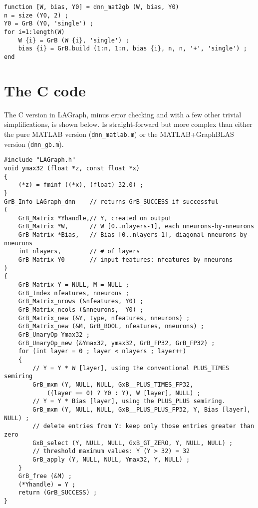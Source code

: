 \documentclass[12pt]{article}
\begin{document}
{\footnotesize
\begin{verbatim}
function [W, bias, Y0] = dnn_mat2gb (W, bias, Y0)
n = size (Y0, 2) ;
Y0 = GrB (Y0, 'single') ;
for i=1:length(W)
    W {i} = GrB (W {i}, 'single') ;
    bias {i} = GrB.build (1:n, 1:n, bias {i}, n, n, '+', 'single') ;
end
\end{verbatim}}


\newpage

\section{The C code}

The C version in LAGraph, minus error checking and with a
few other trivial simplifications, is shown below.  Is straight-forward
but more complex than either the pure MATLAB version (\verb'dnn_matlab.m')
or the MATLAB+GraphBLAS version (\verb'dnn_gb.m').

{\footnotesize
\begin{verbatim}
#include "LAGraph.h"
void ymax32 (float *z, const float *x)
{
    (*z) = fminf ((*x), (float) 32.0) ;
}
GrB_Info LAGraph_dnn    // returns GrB_SUCCESS if successful
(
    GrB_Matrix *Yhandle,// Y, created on output
    GrB_Matrix *W,      // W [0..nlayers-1], each nneurons-by-nneurons
    GrB_Matrix *Bias,   // Bias [0..nlayers-1], diagonal nneurons-by-nneurons
    int nlayers,        // # of layers
    GrB_Matrix Y0       // input features: nfeatures-by-nneurons
)
{
    GrB_Matrix Y = NULL, M = NULL ;
    GrB_Index nfeatures, nneurons ;
    GrB_Matrix_nrows (&nfeatures, Y0) ;
    GrB_Matrix_ncols (&nneurons,  Y0) ;
    GrB_Matrix_new (&Y, type, nfeatures, nneurons) ;
    GrB_Matrix_new (&M, GrB_BOOL, nfeatures, nneurons) ;
    GrB_UnaryOp Ymax32 ;
    GrB_UnaryOp_new (&Ymax32, ymax32, GrB_FP32, GrB_FP32) ;
    for (int layer = 0 ; layer < nlayers ; layer++)
    {
        // Y = Y * W [layer], using the conventional PLUS_TIMES semiring
        GrB_mxm (Y, NULL, NULL, GxB__PLUS_TIMES_FP32,
            ((layer == 0) ? Y0 : Y), W [layer], NULL) ;
        // Y = Y * Bias [layer], using the PLUS_PLUS semiring.
        GrB_mxm (Y, NULL, NULL, GxB__PLUS_PLUS_FP32, Y, Bias [layer], NULL) ;
        // delete entries from Y: keep only those entries greater than zero
        GxB_select (Y, NULL, NULL, GxB_GT_ZERO, Y, NULL, NULL) ;
        // threshold maximum values: Y (Y > 32) = 32
        GrB_apply (Y, NULL, NULL, Ymax32, Y, NULL) ;
    }
    GrB_free (&M) ;
    (*Yhandle) = Y ;
    return (GrB_SUCCESS) ;
} \end{verbatim}}
\end{document}
